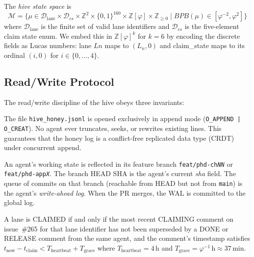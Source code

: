 \begin{definition}
\label{def:K-state-space}
The \emph{hive state space} is
\[
  \mathcal{M} = \bigl\{ \mu \in \mathcal{D}_{\text{lane}} \times
    \mathcal{D}_{\textit{cs}} \times \mathbb{Z}^{2} \times \{0,1\}^{160}
    \times \mathbb{Z}[\varphi] \times \mathbb{Z}_{\geq 0} \;\big|\;
    \textit{BPB}(\mu) \in [\varphi^{-2}, \varphi^{2}]\bigr\}
\]
where $\mathcal{D}_{\text{lane}}$ is the finite set of valid lane
identifiers and $\mathcal{D}_{\textit{cs}}$ is the five-element claim
state enum. We embed this in $\mathbb{Z}[\varphi]^{k}$ for $k = 6$ by
encoding the discrete fields as Lucas numbers: lane $Ln$ maps to
$(L_n, 0)$ and claim\_state maps to its ordinal $(i, 0)$ for
$i \in \{0, \ldots, 4\}$.
\end{definition}

\subsection{Read/Write Protocol}
\label{ssec:K-rw-protocol}

The read/write discipline of the hive obeys three invariants:

\begin{invariant}
\label{inv:K-append-only}
The file \texttt{hive\_honey.jsonl} is opened exclusively in append
mode (\texttt{O\_APPEND | O\_CREAT}). No agent ever truncates,
seeks, or rewrites existing lines. This guarantees that the honey log
is a conflict-free replicated data type (CRDT) under concurrent
append.
\end{invariant}

\begin{invariant}
\label{inv:K-pr-branch}
An agent's working state is reflected in its feature branch
\texttt{feat/phd-ch\textit{NN}} or \texttt{feat/phd-app\textit{X}}.
The branch HEAD SHA is the agent's current \textit{sha} field. The
queue of commits on that branch (reachable from HEAD but not from
\texttt{main}) is the agent's \emph{write-ahead log}. When the PR
merges, the WAL is committed to the global log.
\end{invariant}

\begin{invariant}
\label{inv:K-comment-claims}
A lane is CLAIMED if and only if the most recent CLAIMING comment on
issue~\#265 for that lane identifier has not been superseded by a
DONE or RELEASE comment from the same agent, and the comment's
timestamp satisfies $t_{\text{now}} - t_{\text{claim}} <
T_{\text{heartbeat}} + T_{\text{grace}}$ where
$T_{\text{heartbeat}} = 4\,\text{h}$ and
$T_{\text{grace}} = \varphi^{-1}\,\text{h} \approx 37\,\text{min}$.
\end{invariant}

